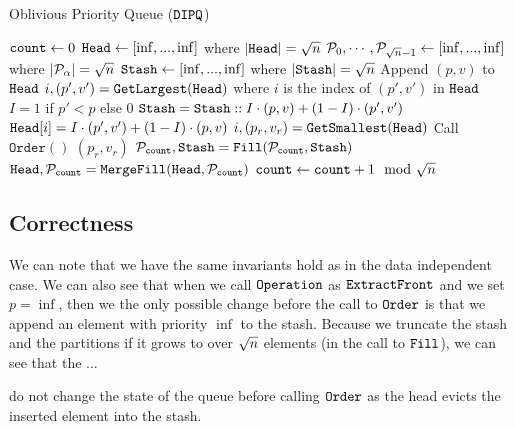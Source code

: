 	
\begin{algorithm}
	\caption{Oblivious Priority Queue ($\texttt{DIPQ}$)}
	\label{alg:ObvQueue}
	\begin{algorithmic}[1]
		\Function{$\DIPQInit$}{}
		\State ${\texttt{count}} \gets 0$
		\State $\texttt{Head} \gets [\inf, ..., \inf]$ where $|\texttt{Head}| = {\sqrt{n}}$
		\State $\mathcal{P}_0, \cdots, \mathcal{P}_{{\sqrt{n}}-1} \gets [\inf, ..., \inf]$ where $|\mathcal{P}_\alpha| = {\sqrt{n}}$
		\State $\texttt{Stash} \gets [\inf, ..., \inf]$ where $|\texttt{Stash}| = {\sqrt{n}}$
		\EndFunction
			\State Append $(p, v)$ to $\texttt{Head}$
			\State $i, (p', v') = \texttt{GetLargest}(\texttt{Head})$ where $i$ is the index of $(p', v')$ in $\texttt{Head}$
			\State $I = 1$ if $p' < p$ else $0$
			\State $\texttt{Stash} = \texttt{Stash} :: I \cdot (p, v) + (1 - I) \cdot (p', v')$
			\State $\texttt{Head}[i] = I \cdot (p', v') + (1 - I) \cdot (p, v)$
			\State $i, (p_r, v_r) = \texttt{GetSmallest}(\texttt{Head})$
			\State Call $\texttt{Order}()$ \label{algline:ObvPQOrderOp}
			\State \Return $(p_r, v_r)$
		\EndFunction
		\Function{$\DIPQOrder$}{}
			\State $\mathcal{P}_{{\texttt{count}}}, \texttt{Stash} = \texttt{Fill}(\mathcal{P}_{\texttt{count}}, \texttt{Stash})$
			\State $\texttt{Head}, \mathcal{P}_{\texttt{count}} = \texttt{MergeFill}(\texttt{Head}, \mathcal{P}_{\texttt{count}})$
			\State ${\texttt{count}} \gets {\texttt{count}} + 1 \mod {{\sqrt{n}}}$
		\EndFunction
	\end{algorithmic}
\end{algorithm}


\subsection{Correctness}
We can note that we have the same invariants hold as in the data independent case.
We can also see that when we call $\texttt{Operation}$ as $\texttt{ExtractFront}$ and we set $p = \inf$,
then we the only possible change before the call to $\DIPQOrder$ is that we append an element with priority $\inf$ to the stash.
Because we truncate the stash and the partitions if it grows to over ${\sqrt{n}}$ elements (in the call to $\texttt{Fill}$),
we can see that the ...

do not change the state of the queue before calling $\DIPQOrder$ as 
the head evicts the inserted element into the stash.

